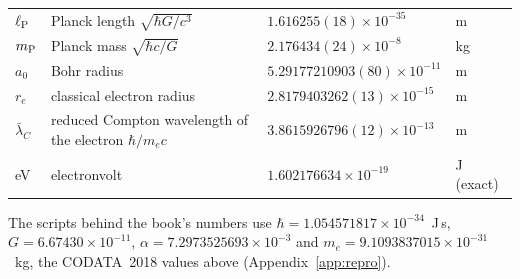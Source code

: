 {\begin{longtable}{@{}>{\raggedright\arraybackslash}p{}>{\raggedright\arraybackslash}p{}>{\raggedright\arraybackslash}p{}>{\raggedright\arraybackslash}p{}@{}}
$\ell_{\mathrm P}$ & Planck length $\sqrt{\hbar G/c^3}$ & $1.616255(18)\times10^{-35}$ & m\\\iamrowrule
$m_{\mathrm P}$ & Planck mass $\sqrt{\hbar c/G}$ & $2.176434(24)\times10^{-8}$ & kg\\\iamrowrule
$a_0$ & Bohr radius & $5.29177210903(80)\times10^{-11}$ & m\\\iamrowrule
$r_e$ & classical electron radius & $2.8179403262(13)\times10^{-15}$ & m\\\iamrowrule
$\bar\lambda_C$ & reduced Compton wavelength of the electron $\hbar/m_ec$ & $3.8615926796(12)\times10^{-13}$ & m\\\iamrowrule
eV & electronvolt & $1.602176634\times10^{-19}$ & J (exact)\\
\bottomrule\end{longtable}}
\noindent The scripts behind the book's numbers use $\hbar=1.054571817\times10^{-34}$~J\,s, $G=6.67430\times10^{-11}$, $\alpha=7.2973525693\times10^{-3}$ and
$m_e=9.1093837015\times10^{-31}$~kg, the CODATA~2018 values above (Appendix~\ref{app:repro}).

